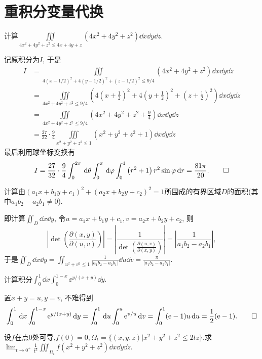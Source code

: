 \section{重积分变量代换}
\begin{quiza}
\woe 计算\(\iiint\limits_{4x^2+4y^2+z^2\leqslant 4x+4y+z}\left(4x^2+4y^2+z^2\right)\dd x\dd y\dd z\).
\begin{solution}
记原积分为\(I\), 于是
\begin{align}
I&=\iiint\limits_{4(x-1/2)^2+4(y-1/2)^2+(z-1/2)^2\leqslant 9/4}\left(4x^2+4y^2+z^2\right)\dd x\dd y\dd z\tag{整理}\\
&=\iiint\limits_{4x^2+4y^2+z^2\leqslant 9/4}\left(4\left(x+\frac{1}{2}\right)^2+4\left(y+\frac{1}{2}\right)^2+\left(z+\frac{1}{2}\right)^2\right)\dd x\dd y\dd z\tag{平移变换}\\
&=\iiint\limits_{4x^2+4y^2+z^2\leqslant 9/4}\left(4x^2+4y^2+z^2+\frac{9}{4}\right)\dd x\dd y\dd z\tag{奇数次项积分为0}\\
&=\frac{27}{32}\cdot\frac{9}{4}\iiint\limits_{x^2+y^2+z^2\leqslant 1}\left(x^2+y^2+z^2+1\right)\dd x\dd y\dd z\tag{伸缩变换}
\end{align}
最后利用球坐标变换有\[I=\frac{27}{32}\cdot\frac{9}{4}\int_{0}^{2\pi}\,\mathrm{d}\theta\int_{0}^{\pi}\,\mathrm{d}\varphi\int_{0}^{1}\left(r^2+1\right)r^2\sin\varphi\,\mathrm{d} r=\frac{81\pi}{20}.\qedhere\]
\end{solution}
\woe 计算由\((a_1x+b_1y+c_1)^2+(a_2x+b_2y+c_2)^2=1\)所围成的有界区域\(D\)的面积(其中\(a_1b_2-a_2b_1\ne 0\)).
\begin{solution}
即计算\(\iint_{D}\dd x\dd y\), 令\(u=a_1x+b_1y+c_1,v=a_2x+b_2y+c_2\), 则\[\left|\det\left(\frac{\partial(x,y)}{\partial(u,v)}\right)\right|=\left|\frac{1}{\det\left(\displaystyle\frac{\partial(u,v)}{\partial(x,y)}\right)}\right|=\left|\frac{1}{a_1b_2-a_2b_1}\right|,\]于是\(\iint_{D}\dd x\dd y=\iint_{u^2+v^2\leqslant 1}\frac{1}{|a_1b_2-a_2b_1|}\dd u\dd v=\frac{\pi}{|a_1b_2-a_2b_1|}\).
\end{solution}
\woe 计算积分\(\int_{0}^{1}\dd x\int_{0}^{1-x}\ee^{y/(x+y)}\dd y.\)
\begin{solution}
置\(x+y=u,y=v\), 不难得到\[\int_{0}^{1}\,\mathrm{d} x\int_{0}^{1-x}\mathrm{e}^{y/(x+y)}\,\mathrm{d} y=\int_{0}^{1}\,\mathrm{d} u\int_{0}^{u}\mathrm{e}^{v/u}\,\mathrm{d} v=\int_{0}^{1}(\mathrm{e}-1)u\,\mathrm{d} u=\frac{1}{2}(\mathrm{e}-1).\qedhere\]
\end{solution}
\woe 设\(f\)在点0处可导,\(f(0)=0,\varOmega_t=\{(x,y,z)\big|x^2+y^2+z^2\leqslant 2tz\}\).求\(\lim_{t\rightarrow 0^+}\frac{1}{t^5}\iiint_{\varOmega_t}f(x^2+y^2+z^2)\dd x\dd y\dd z\).

\end{quiza}
